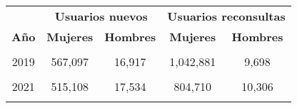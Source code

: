 \begin{tabular}[t]{ccccc}
\toprule
\multicolumn{1}{c}{\textbf{ }} & \multicolumn{2}{c}{\textbf{Usuarios nuevos}} & \multicolumn{2}{c}{\textbf{Usuarios reconsultas}} \\
\cmidrule(l{3pt}r{3pt}){2-3} \cmidrule(l{3pt}r{3pt}){4-5}
\textbf{Año} & \textbf{Mujeres} & \textbf{Hombres} & \textbf{Mujeres} & \textbf{Hombres}\\
\midrule
\cellcolor[HTML]{B6B3FF}{2018} & \cellcolor[HTML]{B6B3FF}{575,437} & \cellcolor[HTML]{B6B3FF}{14,132} & \cellcolor[HTML]{B6B3FF}{1,041,018} & \cellcolor[HTML]{B6B3FF}{7,881}\\
2019 & 567,097 & 16,917 & 1,042,881 & 9,698\\
\cellcolor[HTML]{B6B3FF}{2020} & \cellcolor[HTML]{B6B3FF}{534,339} & \cellcolor[HTML]{B6B3FF}{15,679} & \cellcolor[HTML]{B6B3FF}{970,926} & \cellcolor[HTML]{B6B3FF}{9,903}\\
2021 & 515,108 & 17,534 & 804,710 & 10,306\\
\cellcolor[HTML]{B6B3FF}{2022} & \cellcolor[HTML]{B6B3FF}{530,699} & \cellcolor[HTML]{B6B3FF}{15,551} & \cellcolor[HTML]{B6B3FF}{604,890} & \cellcolor[HTML]{B6B3FF}{10,426}\\
\bottomrule
\end{tabular}

